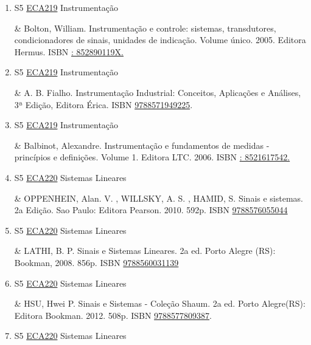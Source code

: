 \documentclass[12pt,a4paper]{book}
\begin{document}
\begin{enumerate}
 \item S5 \hyperref[PUD:ECA219]{ECA219} Instrumentação

&  Bolton, William.  Instrumentação e controle: sistemas, transdutores, condicionadores de sinais, unidades de indicação.  Volume único.  2005.  Editora Hermus.  ISBN \href{http://www.google.com/search?hl=pt-BR&tbo=p&tbm=bks&q=isbn:: 852890119X.&num=10}{: 852890119X.}
 \item S5 \hyperref[PUD:ECA219]{ECA219} Instrumentação

&  A.  B.  Fialho.  Instrumentação Industrial: Conceitos, Aplicações e Análises, 3ª Edição, Editora Érica.  ISBN \href{http://www.bn.br/site/pages/servicosProfissionais/agenciaISBN/isbnBusca/FbnBuscaISBNCatalogo.asp?pField=ISBN&pIntPagina=1&pISBN=71949225&nidbISBN=true&hidbISBN=true}{9788571949225}. 

 

 \item S5 \hyperref[PUD:ECA219]{ECA219} Instrumentação

&  Balbinot, Alexandre.  Instrumentação e fundamentos de medidas - princípios e definições.  Volume 1.  Editora LTC.  2006.  ISBN \href{http://www.google.com/search?hl=pt-BR&tbo=p&tbm=bks&q=isbn:: 8521617542.&num=10}{: 8521617542.} 

 

 \item S5 \hyperref[PUD:ECA220]{ECA220} Sistemas Lineares

&  OPPENHEIN, Alan.  V. , WILLSKY, A. S. , HAMID, S.  Sinais e sistemas.  2a Edição.  Sao Paulo: Editora Pearson.  2010.  592p.  ISBN \href{http://www.bn.br/site/pages/servicosProfissionais/agenciaISBN/isbnBusca/FbnBuscaISBNCatalogo.asp?pField=ISBN&pIntPagina=1&pISBN=76055044&nidbISBN=true&hidbISBN=true}{9788576055044}
 

 \item S5 \hyperref[PUD:ECA220]{ECA220} Sistemas Lineares

&  LATHI, B.  P.  Sinais e Sistemas Lineares.  2a ed.  Porto Alegre (RS): Bookman, 2008.  856p.  ISBN \href{http://www.bn.br/site/pages/servicosProfissionais/agenciaISBN/isbnBusca/FbnBuscaISBNCatalogo.asp?pField=ISBN&pIntPagina=1&pISBN=60031139&nidbISBN=true&hidbISBN=true}{9788560031139}
 

 \item S5 \hyperref[PUD:ECA220]{ECA220} Sistemas Lineares

&  HSU, Hwei P.  Sinais e Sistemas - Coleção Shaum.  2a ed.  Porto Alegre(RS): Editora Bookman.  2012.  508p.  ISBN \href{http://www.bn.br/site/pages/servicosProfissionais/agenciaISBN/isbnBusca/FbnBuscaISBNCatalogo.asp?pField=ISBN&pIntPagina=1&pISBN=77809387&nidbISBN=true&hidbISBN=true}{9788577809387}.
 \item S5 \hyperref[PUD:ECA220]{ECA220} Sistemas Lineares


\end{enumerate}
\end{document}
